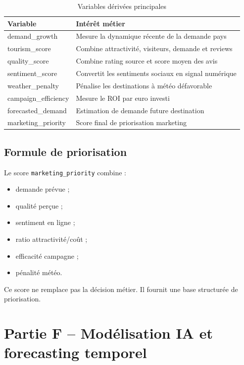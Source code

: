 \documentclass[11pt,a4paper]{report}
\begin{document}
\begin{table}[H]
\centering
\caption{Variables dérivées principales}
\begin{tabularx}{\textwidth}{lX}
\toprule
\textbf{Variable} & \textbf{Intérêt métier} \\
\midrule
demand\_growth & Mesure la dynamique récente de la demande pays \\
tourism\_score & Combine attractivité, visiteurs, demande et reviews \\
quality\_score & Combine rating source et score moyen des avis \\
sentiment\_score & Convertit les sentiments sociaux en signal numérique \\
weather\_penalty & Pénalise les destinations à météo défavorable \\
campaign\_efficiency & Mesure le ROI par euro investi \\
forecasted\_demand & Estimation de demande future destination \\
marketing\_priority & Score final de priorisation marketing \\
\bottomrule
\end{tabularx}
\end{table}

\section{Formule de priorisation}

Le score \texttt{marketing\_priority} combine :

\begin{itemize}[leftmargin=*]
    \item demande prévue ;
    \item qualité perçue ;
    \item sentiment en ligne ;
    \item ratio attractivité/coût ;
    \item efficacité campagne ;
    \item pénalité météo.
\end{itemize}

Ce score ne remplace pas la décision métier. Il fournit une base structurée de priorisation.

\chapter{Partie F -- Modélisation IA et forecasting temporel}
\end{document}
